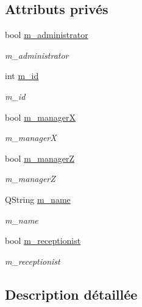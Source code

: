 \subsection*{Attributs privés}
\begin{DoxyCompactItemize}
\item 
bool \hyperlink{classSimpleHotel_1_1SH__User_a5b21345a4a8504cd7e6a1bde9fadd687}{m\-\_\-administrator}
\begin{DoxyCompactList}\small\item\em m\-\_\-administrator \end{DoxyCompactList}\item 
int \hyperlink{classSimpleHotel_1_1SH__User_a499824b11b5dff45768faa5bc02cdd54}{m\-\_\-id}
\begin{DoxyCompactList}\small\item\em m\-\_\-id \end{DoxyCompactList}\item 
bool \hyperlink{classSimpleHotel_1_1SH__User_a6b30ee33901dceae3148c79edbbc3f6e}{m\-\_\-manager\-X}
\begin{DoxyCompactList}\small\item\em m\-\_\-manager\-X \end{DoxyCompactList}\item 
bool \hyperlink{classSimpleHotel_1_1SH__User_ab051b175496577f7e6ad62b7f2a4eb44}{m\-\_\-manager\-Z}
\begin{DoxyCompactList}\small\item\em m\-\_\-manager\-Z \end{DoxyCompactList}\item 
Q\-String \hyperlink{classSimpleHotel_1_1SH__User_a5612336f4b4aa4c4557c401baf87cc7f}{m\-\_\-name}
\begin{DoxyCompactList}\small\item\em m\-\_\-name \end{DoxyCompactList}\item 
bool \hyperlink{classSimpleHotel_1_1SH__User_aeeb0dba525527d776c3dbda7551e3336}{m\-\_\-receptionist}
\begin{DoxyCompactList}\small\item\em m\-\_\-receptionist \end{DoxyCompactList}\end{DoxyCompactItemize}


\subsection{Description détaillée}


